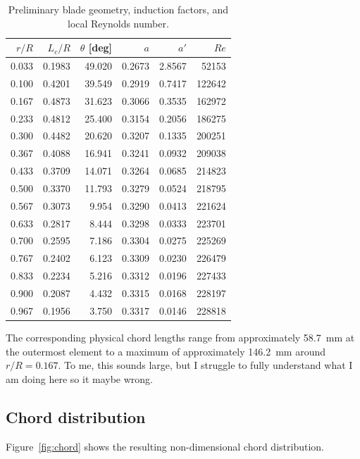 \documentclass[11pt,a4paper]{article}
\begin{document}
\begin{table}[H]
\centering
\caption{Preliminary blade geometry, induction factors, and local Reynolds number.}
\label{tab:geometry}
\small
\begin{tabular}{rrrrrr}
\toprule
$r/R$ & $L_c/R$ & $\theta$ [deg] & $a$ & $a'$ & $Re$ \\
\midrule
0.033 & 0.1983 & 49.020 & 0.2673 & 2.8567 & 52153 \\
0.100 & 0.4201 & 39.549 & 0.2919 & 0.7417 & 122642 \\
0.167 & 0.4873 & 31.623 & 0.3066 & 0.3535 & 162972 \\
0.233 & 0.4812 & 25.400 & 0.3154 & 0.2056 & 186275 \\
0.300 & 0.4482 & 20.620 & 0.3207 & 0.1335 & 200251 \\
0.367 & 0.4088 & 16.941 & 0.3241 & 0.0932 & 209038 \\
0.433 & 0.3709 & 14.071 & 0.3264 & 0.0685 & 214823 \\
0.500 & 0.3370 & 11.793 & 0.3279 & 0.0524 & 218795 \\
0.567 & 0.3073 & 9.954 & 0.3290 & 0.0413 & 221624 \\
0.633 & 0.2817 & 8.444 & 0.3298 & 0.0333 & 223701 \\
0.700 & 0.2595 & 7.186 & 0.3304 & 0.0275 & 225269 \\
0.767 & 0.2402 & 6.123 & 0.3309 & 0.0230 & 226479 \\
0.833 & 0.2234 & 5.216 & 0.3312 & 0.0196 & 227433 \\
0.900 & 0.2087 & 4.432 & 0.3315 & 0.0168 & 228197 \\
0.967 & 0.1956 & 3.750 & 0.3317 & 0.0146 & 228818 \\
\bottomrule
\end{tabular}
\end{table}

The corresponding physical chord lengths range from approximately
\SI{58.7}{mm} at the outermost element to a maximum of approximately
\SI{146.2}{mm} around $r/R=0.167$. To me, this sounds large, but I struggle to
fully understand what I am doing here so it maybe wrong.

\subsection{Chord distribution}

Figure~\ref{fig:chord} shows the resulting non-dimensional chord
distribution.
\end{document}

